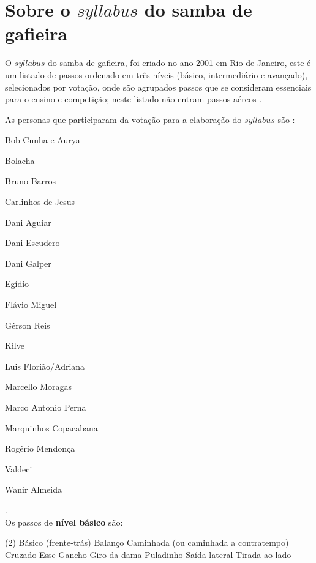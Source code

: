 \newpage
\section{Sobre o $syllabus$ do samba de gafieira}

O $syllabus$  do samba de gafieira, foi criado no ano 2001 em Rio de Janeiro,
este é um listado de passos ordenado em três níveis (básico, intermediário e avançado),
selecionados por votação,
onde são agrupados passos que se consideram essenciais para o ensino e competição;
neste listado não entram passos aéreos \cite[pp. 144]{perna2002samba}.


As personas que participaram da votação para a elaboração do $syllabus$ são \cite[pp. 144]{perna2002samba}:
\begin{inparaitem}[$*$]
\item Bob Cunha e Aurya
\item Bolacha
\item Bruno Barros
\item Carlinhos de Jesus
\item Dani Aguiar
\item Dani Escudero
\item Dani Galper
\item Egídio
\item Flávio Miguel
\item Gérson Reis
\item Kilve
\item Luis Florião/Adriana
\item Marcello Moragas
\item Marco Antonio Perna
\item Marquinhos Copacabana
\item Rogério Mendonça
\item Valdeci
\item Wanir Almeida
\end{inparaitem}.\\



Os passos de \textbf{nível básico} são:
\begin{tasks}(2)
\task Básico (frente-trás)
\task Balanço 
\task Caminhada (ou caminhada a contratempo)
\task Cruzado
\task Esse
\task Gancho
\task Giro da dama
\task Puladinho
\task Saída lateral
\task Tirada ao lado
\end{tasks}~\\


